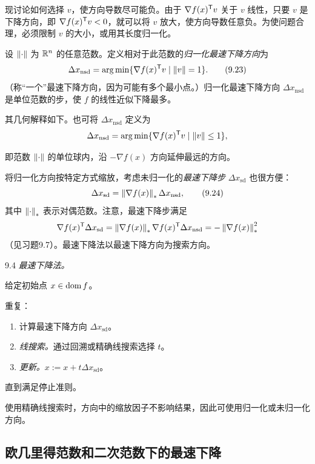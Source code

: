 现讨论如何选择 $v$，使方向导数尽可能负。由于 $\nabla f(x)^\mathsf T v$ 关于 $v$ 线性，只要 $v$ 是下降方向，即 $\nabla f(x)^\mathsf T v<0$，就可以将 $v$ 放大，使方向导数任意负。为使问题合理，必须限制 $v$ 的大小，或用其长度归一化。

设 $\left\lVert \cdot\right\rVert$ 为 $\mathbb R^n$ 的任意范数。定义相对于此范数的\emph{归一化最速下降方向}为
\begin{equation}
\Delta x_{\mathrm{nsd}}=
\operatorname*{arg\,min}\{\nabla f(x)^\mathsf T v\mid\left\lVert v\right\rVert=1\}.\tag{9.23}
\end{equation}
（称“一个”最速下降方向，因为可能有多个最小点。）归一化最速下降方向 $\Delta x_{\mathrm{nsd}}$ 是单位范数的步，使 $f$ 的线性近似下降最多。

其几何解释如下。也可将 $\Delta x_{\mathrm{nsd}}$ 定义为
\[
\Delta x_{\mathrm{nsd}}=
\operatorname*{arg\,min}\{\nabla f(x)^\mathsf T v\mid\left\lVert v\right\rVert\le1\},
\]

即范数 $\left\lVert \cdot\right\rVert$ 的单位球内，沿 $-\nabla f(x)$ 方向延伸最远的方向。

将归一化方向按特定方式缩放，考虑未归一化的\emph{最速下降步} $\Delta x_{\mathrm{sd}}$ 也很方便：
\begin{equation}
\Delta x_{\mathrm{sd}}=\left\lVert \nabla f(x)\right\rVert_*\Delta x_{\mathrm{nsd}},\tag{9.24}
\end{equation}
其中 $\left\lVert \cdot\right\rVert_*$ 表示对偶范数。注意，最速下降步满足
\[
\nabla f(x)^\mathsf T\Delta x_{\mathrm{sd}}
=\left\lVert \nabla f(x)\right\rVert_*\nabla f(x)^\mathsf T\Delta x_{\mathrm{nsd}}
=-\left\lVert \nabla f(x)\right\rVert_*^2
\]
（见习题9.7）。最速下降法以最速下降方向为搜索方向。

\begin{origalgorithm}{9.4}
\emph{最速下降法。}

给定初始点 $x\in\operatorname{dom} f$。

重复：
\begin{enumerate}
\item 计算最速下降方向 $\Delta x_{\mathrm{sd}}$。
\item \emph{线搜索。}通过回溯或精确线搜索选择 $t$。
\item \emph{更新。}$x:=x+t\Delta x_{\mathrm{sd}}$。
\end{enumerate}
直到满足停止准则。
\end{origalgorithm}

使用精确线搜索时，方向中的缩放因子不影响结果，因此可使用归一化或未归一化方向。

\subsection{欧几里得范数和二次范数下的最速下降}
